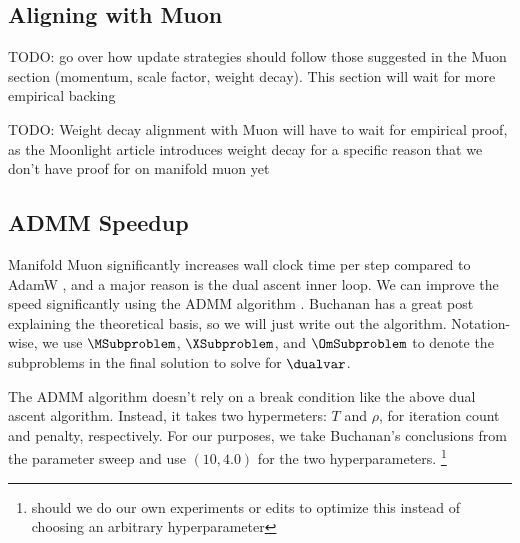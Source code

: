 \documentclass[12pt]{article}
\begin{document}
\subsection{Aligning with Muon}

TODO: go over how update strategies should follow those suggested in the Muon section (momentum, scale factor, weight decay). This section will wait for more empirical backing

TODO: Weight decay alignment with Muon will have to wait for empirical proof, as the Moonlight article introduces weight decay for a specific reason that we don't have proof for on manifold muon yet

\subsection{ADMM Speedup}

Manifold Muon significantly increases wall clock time per step compared to AdamW \cite{bernstein2025manifolds}, and a major reason is the dual ascent inner loop. We can improve the speed significantly using the ADMM algorithm \cite{buchanan2025mmuonadmm}. Buchanan has a great post explaining the theoretical basis, so we will just write out the algorithm. Notation-wise, we use $\MSubproblem$, $\XSubproblem$, and $\OmSubproblem$ to denote the subproblems in the final solution to solve for $\dualvar$. 

The ADMM algorithm doesn't rely on a break condition like the above dual ascent algorithm. Instead, it takes two hypermeters: $T$ and $\rho$, for iteration count and penalty, respectively. For our purposes, we take Buchanan's conclusions from the parameter sweep and use $(10, 4.0)$ for the two hyperparameters. \footnote{should we do our own experiments or edits to optimize this instead of choosing an arbitrary hyperparameter}
\end{document}
